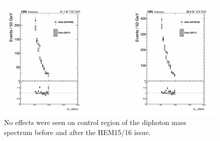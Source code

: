 \begin{figure}[!htb]
	\centering
	\includegraphics[scale=0.65]{fig/HEM15:16BarrelBeforeAndAfter.png}
	\caption{No effects were seen on control region of the diphoton mass spectrum before and after the HEM15/16 issue.}
	\label{fig:HEM1516BarrelBeforeAndAfter}
\end{figure}



\newpage
% 
% 
